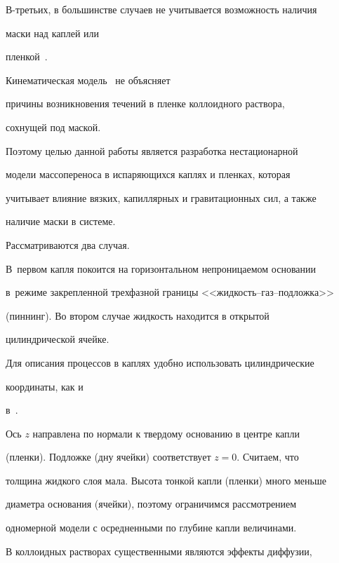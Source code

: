 В-третьих, в большинстве случаев не учитывается возможность наличия

маски над каплей или

пленкой~\cite{Okuzono2009,MakiKumar2011,Gordeeva2014,LebedevStepanov2017}.

Кинематическая модель~\cite{TarasevichSakharova16} не объясняет

причины возникновения течений в пленке коллоидного раствора,

сохнущей под маской.



Поэтому целью данной работы является разработка нестационарной

модели массопереноса в испаряющихся каплях и пленках, которая

учитывает влияние вязких, капиллярных и гравитационных сил, а также

наличие маски в системе.



\smallskip



 Рассматриваются два случая. \linebreak

В~первом капля покоится на горизонтальном непроницаемом основании 

в~режиме закрепленной трехфазной границы <<жидкость--газ--подложка>>

(пиннинг). Во втором случае жидкость находится в открытой

цилиндрической ячейке.



Для описания процессов в каплях удобно использовать цилиндрические

координаты, как и

в~\cite{Kolegov2014a,Kolegov2014b,Kolegov2014c,KolegovLobanov2012}.

Ось $z$ направлена по нормали к твердому основанию в центре капли

(пленки). Подложке (дну ячейки) соответствует $z = 0$. Считаем, что

толщина жидкого слоя мала. Высота тонкой капли (пленки) много меньше

диаметра основания (ячейки), поэтому ограничимся рассмотрением

одномерной модели с осредненными по глубине капли величинами.



В коллоидных растворах существенными являются эффекты диффузии,

